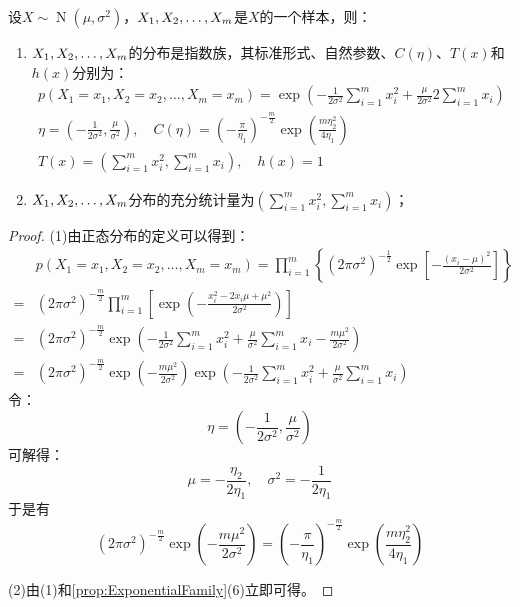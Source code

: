 \begin{theorem}
	设$X\sim\operatorname{N}(\mu,\sigma^2)$，$X_1, X_2, \dots, X_{m}$是$X$的一个样本，则：
	\begin{enumerate}
		\item $X_1, X_2, \dots, X_{m}$的分布是指数族，其标准形式、自然参数、$C(\eta)$、$T(x)$和$h(x)$分别为：
		\begin{gather*}
			p(X_1=x_1,X_2=x_2,\dots,X_m=x_m)=\exp\left(-\frac{1}{2\sigma^2}\sum_{i=1}^{m}x_i^2+\frac{\mu}{2\sigma^2}2\sum_{i=1}^{m}x_i\right) \\
			\eta=\left(-\frac{1}{2\sigma^2},\frac{\mu}{\sigma^2}\right),\quad C(\eta)=\left(-\frac{\pi}{\eta_1}\right)^{-\frac{m}{2}}\exp\left(\frac{m\eta_2^2}{4\eta_1}\right) \\
			T(x)=\left(\sum_{i=1}^{m}x_i^2,\sum_{i=1}^{m}x_i\right),\quad h(x)=1
		\end{gather*}
		\item $X_1, X_2, \dots, X_{m}$分布的充分统计量为$\left(\sum\limits_{i=1}^{m}x_i^2,\sum\limits_{i=1}^{m}x_i\right)$；
	\end{enumerate}
\end{theorem}
\begin{proof}
	(1)由正态分布的定义可以得到：
	\begin{align*}
		&p(X_1=x_1,X_2=x_2,\dots,X_m=x_m)=\prod_{i=1}^{m}\left\{(2\pi\sigma^2)^{-\frac{1}{2}}\exp\left[-\frac{(x_i-\mu)^2}{2\sigma^2}\right]\right\} \\
		=&(2\pi\sigma^2)^{-\frac{m}{2}}\prod_{i=1}^{m}\left[\exp\left(-\frac{x_i^2-2x_i\mu+\mu^2}{2\sigma^2}\right)\right] \\
		=&(2\pi\sigma^2)^{-\frac{m}{2}}\exp\left(-\frac{1}{2\sigma^2}\sum_{i=1}^{m}x_i^2+\frac{\mu}{\sigma^2}\sum_{i=1}^{m}x_i-\frac{m\mu^2}{2\sigma^2}\right) \\
		=&(2\pi\sigma^2)^{-\frac{m}{2}}\exp\left(-\frac{m\mu^2}{2\sigma^2}\right)\exp\left(-\frac{1}{2\sigma^2}\sum_{i=1}^{m}x_i^2+\frac{\mu}{\sigma^2}\sum_{i=1}^{m}x_i\right)
	\end{align*}
	令：
	\begin{equation*}
		\eta=\left(-\frac{1}{2\sigma^2},\frac{\mu}{\sigma^2}\right)
	\end{equation*}
	可解得：
	\begin{equation*}
		\mu=-\frac{\eta_2}{2\eta_1},\quad\sigma^2=-\frac{1}{2\eta_1}
	\end{equation*}
	于是有
	\begin{equation*}
		(2\pi\sigma^2)^{-\frac{m}{2}}\exp\left(-\frac{m\mu^2}{2\sigma^2}\right)=\left(-\frac{\pi}{\eta_1}\right)^{-\frac{m}{2}}\exp\left(\frac{m\eta_2^2}{4\eta_1}\right)
	\end{equation*}\par
	(2)由(1)和\cref{prop:ExponentialFamily}(6)立即可得。
\end{proof}


